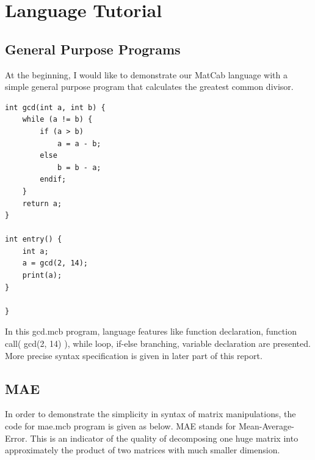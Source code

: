 \documentclass[12pt]{article} %
\begin{document}
\section{Language Tutorial}
\subsection{General Purpose Programs}
At the beginning, I would like to demonstrate our MatCab language with a simple general purpose program that calculates the greatest common divisor.

\begin{lstlisting}[firstline=1,lastline=30]
int gcd(int a, int b) {
    while (a != b) {
        if (a > b) 
            a = a - b;
        else
            b = b - a;
        endif;
    }
    return a;
}

int entry() {
    int a;
    a = gcd(2, 14);
    print(a);
}

}
\end{lstlisting}

In this gcd.mcb program, language features like function declaration, function call( gcd(2, 14) ), while loop, if-else branching, variable declaration are presented. More precise syntax specification is given in later part of this report.

\subsection{MAE}

In order to demonstrate the simplicity in syntax of matrix manipulations, the code for mae.mcb program is given as below. MAE stands for Mean-Average-Error. This is an indicator of the quality of decomposing one huge matrix into approximately the product of two matrices with much smaller dimension.
\end{document}
